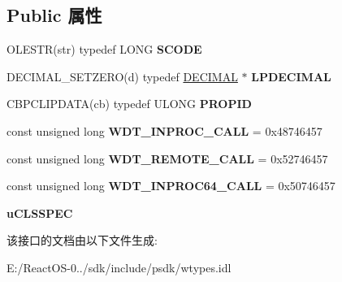 \subsection*{Public 属性}
\begin{DoxyCompactItemize}
\item 
\mbox{\label{interface_i_win_types_a83e0ee22809d363b246b108bee1c6730}} 
O\+L\+E\+S\+TR(str) typedef L\+O\+NG {\bfseries S\+C\+O\+DE}
\item 
\mbox{\label{interface_i_win_types_a664e3fedd003d40f29bbd9830cabeb94}} 
D\+E\+C\+I\+M\+A\+L\+\_\+\+S\+E\+T\+Z\+E\+RO(d) typedef \hyperlink{struct_i_win_types_1_1tag_d_e_c}{D\+E\+C\+I\+M\+AL} $\ast$ {\bfseries L\+P\+D\+E\+C\+I\+M\+AL}
\item 
\mbox{\label{interface_i_win_types_a3d7effae0e6c417258d59c10ff9e070e}} 
C\+B\+P\+C\+L\+I\+P\+D\+A\+TA(cb) typedef U\+L\+O\+NG {\bfseries P\+R\+O\+P\+ID}
\item 
\mbox{\label{interface_i_win_types_abcd541cbab9747733155c79d3958785a}} 
const unsigned long {\bfseries W\+D\+T\+\_\+\+I\+N\+P\+R\+O\+C\+\_\+\+C\+A\+LL} = 0x48746457
\item 
\mbox{\label{interface_i_win_types_ad8ccb43545a054276081beea203cfef6}} 
const unsigned long {\bfseries W\+D\+T\+\_\+\+R\+E\+M\+O\+T\+E\+\_\+\+C\+A\+LL} = 0x52746457
\item 
\mbox{\label{interface_i_win_types_af3f1b45bc82719b40bfa6fd382625934}} 
const unsigned long {\bfseries W\+D\+T\+\_\+\+I\+N\+P\+R\+O\+C64\+\_\+\+C\+A\+LL} = 0x50746457
\item 
\mbox{\label{interface_i_win_types_a2043a68e32948bb02580c52d31f95048}} 
{\bfseries u\+C\+L\+S\+S\+P\+EC}
\end{DoxyCompactItemize}


该接口的文档由以下文件生成\+:\begin{DoxyCompactItemize}
\item 
E\+:/\+React\+O\+S-\/0../sdk/include/psdk/wtypes.\+idl\end{DoxyCompactItemize}
